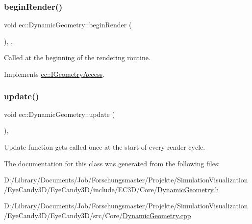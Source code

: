 \subsubsection{\texorpdfstring{begin\+Render()}{beginRender()}}
{\footnotesize\ttfamily void ec\+::\+Dynamic\+Geometry\+::begin\+Render (\begin{DoxyParamCaption}{ }\end{DoxyParamCaption})\hspace{0.3cm}{\ttfamily [override]}, {\ttfamily [protected]}, {\ttfamily [virtual]}}

Called at the beginning of the rendering routine. 

Implements \mbox{\hyperlink{classec_1_1_i_geometry_access_a17a87aca44e2a23a6185e78262e02652}{ec\+::\+I\+Geometry\+Access}}.

\mbox{\label{classec_1_1_dynamic_geometry_a76ddfd59d22b89ada5af4fc57e118dee}} 
\subsubsection{\texorpdfstring{update()}{update()}}
{\footnotesize\ttfamily void ec\+::\+Dynamic\+Geometry\+::update (\begin{DoxyParamCaption}{ }\end{DoxyParamCaption})\hspace{0.3cm}{\ttfamily [protected]}, {\ttfamily [virtual]}}

Update function gets called once at the start of every render cycle. 

The documentation for this class was generated from the following files\+:\begin{DoxyCompactItemize}
\item 
D\+:/\+Library/\+Documents/\+Job/\+Forschungsmaster/\+Projekte/\+Simulation\+Visualization/\+Eye\+Candy3\+D/\+Eye\+Candy3\+D/include/\+E\+C3\+D/\+Core/\mbox{\hyperlink{_dynamic_geometry_8h}{Dynamic\+Geometry.\+h}}\item 
D\+:/\+Library/\+Documents/\+Job/\+Forschungsmaster/\+Projekte/\+Simulation\+Visualization/\+Eye\+Candy3\+D/\+Eye\+Candy3\+D/src/\+Core/\mbox{\hyperlink{_dynamic_geometry_8cpp}{Dynamic\+Geometry.\+cpp}}\end{DoxyCompactItemize}
